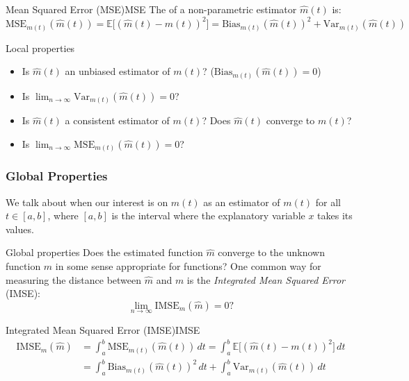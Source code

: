 \begin{definition}{Mean Squared Error (MSE)}{MSE}
	The  of a non-parametric estimator $\hat m(t)$ is:
	\begin{equation*}
		\text{MSE}_{m(t)}(\hat m(t)) = \mathbb E\bigl[(\hat m(t) - m(t))^2\bigr]
		= \text{Bias}_{m(t)}(\hat m(t))^2 + \text{Var}_{m(t)}(\hat m(t))
	\end{equation*}
\end{definition}

\begin{question}{Local properties}{}
	\begin{itemize}
		\item Is $\hat m (t)$ an unbiased estimator of $m(t)$? ($\text{Bias}_{m(t)}(\hat m(t)) = 0$)
		\item Is $\lim_{n\to\infty}\text{Var}_{m(t)}(\hat m(t)) = 0$?
		\item Is $\hat m (t)$ a consistent estimator of $m(t)$? Does $\hat m (t)$ converge to $m(t)$?
		\item Is $\lim_{n\to\infty}\text{MSE}_{m(t)}(\hat m(t)) = 0$?
	\end{itemize}
\end{question}

\subsubsection{Global Properties}

We talk about  when our interest is on $\hat m(t)$
as an estimator of $m(t)$ for all $t \in [a, b]$, where $[a, b]$ is the
interval where the explanatory variable $x$ takes its values.

\begin{question}{Global properties}{}
	Does the estimated function $\hat m$ converge to the unknown function $m$
	in some sense appropriate for functions?
	\tcblower
	One common way for measuring the distance between $\hat m$ and $m$ is
	the \emph{Integrated Mean Squared Error} (IMSE):
	\begin{equation*}
		\lim_{n\to\infty} \text{IMSE}_{m}(\hat m) = 0?
	\end{equation*}
\end{question}

\begin{definition}{Integrated Mean Squared Error (IMSE)}{IMSE}
	\begin{align*}
		\text{IMSE}_{m}(\hat m) & = \int_a^b \text{MSE}_{m(t)}(\hat m(t)) \, dt
		= \int_a^b \mathds{E}\bigl[(\hat m(t) - m(t))^2\bigr] \, dt                  \\
		                        & = \int_a^b \text{Bias}_{m(t)}(\hat m(t))^2 \, dt +
		\int_a^b \text{Var}_{m(t)}(\hat m(t)) \, dt
	\end{align*}
\end{definition}

